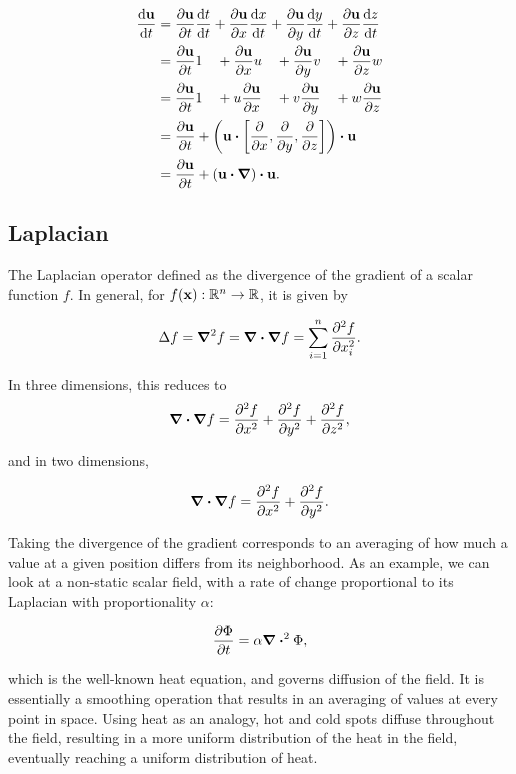 \begin{alignat*}{2}
    \dv{\vb{u}}{t} &= \pdv{\vb{u}}{t}\dv{t}{t} 
                    + \pdv{\vb{u}}{x}\dv{x}{t} 
                    + \pdv{\vb{u}}{y}\dv{y}{t} 
                    + \pdv{\vb{u}}{z}\dv{z}{t} \\
                    &= \pdv{\vb{u}}{t} 1 \quad
                    + \pdv{\vb{u}}{x} u \quad
                    + \pdv{\vb{u}}{y} v \quad
                    + \pdv{\vb{u}}{z} w \\
                    &= \pdv{\vb{u}}{t} 1 \quad
                    + u \pdv{\vb{u}}{x} \quad
                    + v \pdv{\vb{u}}{y} \quad
                    + w \pdv{\vb{u}}{z} \\
                    &= \pdv{\vb{u}}{t} +
                    \qty(
                        \vb{u}
                        \vdot
                        \left[ \pdv{x}, \pdv{y}, \pdv{z} \right]
                    ) \vdot \vb{u} \\
                    &= \pdv{\vb{u}}{t}
                    + \qty(\vb{u}\vdot\grad)\vdot\vb{u}.
\end{alignat*}

\subsection*{Laplacian}
The Laplacian operator defined as the divergence of the gradient of a scalar
function $f$. In general, for $f(\vb{x}): \mathbb{R}^n \to \mathbb{R}$, it is
given by

    $$\Delta f = \grad^2{f} = \grad \vdot \grad f = \sum_{i=1}^n
\pdv[2]{f}{x_i}.$$

In three dimensions, this reduces to 
$$\grad \vdot \grad f = \pdv[2]{f}{x} + \pdv[2]{f}{y} + \pdv[2]{f}{z},$$

and in two dimensions,

$$ \grad \vdot \grad f = \pdv[2]{f}{x} + \pdv[2]{f}{y}.$$

Taking the divergence of the gradient corresponds to an averaging of how much
a value at a given position differs from its neighborhood. As an example, we
can look at a non-static scalar field, with a rate of change proportional to
its Laplacian with proportionality $\alpha$:

$$
    \pdv{\Phi}{t} = \alpha \div^2\Phi,
$$

which is the well-known heat equation, and governs diffusion of the field. It is
essentially a smoothing operation that results in an averaging of values at
every point in space. Using heat as an analogy, hot and cold spots diffuse
throughout the field, resulting in a more uniform distribution of the heat in
the field, eventually reaching a uniform distribution of heat.

